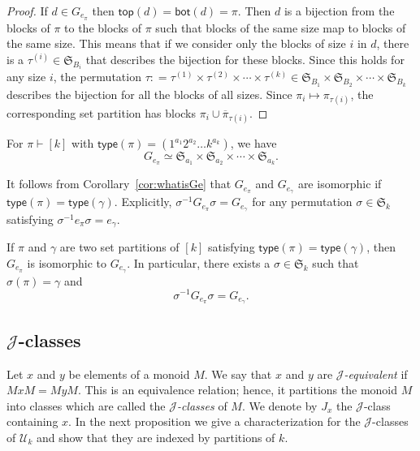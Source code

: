 \documentclass[ALCO,Unicode]{cedram}
\newcommand{\defncolor}{\color{darkred}}
\newcommand{\defn}[1]{{\defncolor\emph{#1}}} %
\begin{document}
\begin{proof}
If $d\in G_{e_\pi}$ then $\mathsf{top}(d) = \mathsf{bot}(d) = \pi$. Then $d$ is a bijection from the
blocks of $\pi$ to the blocks of $\pi$ such that blocks of the same size map to blocks of the same size.  This means that if
we consider only the blocks of size $i$ in $d$, there is a $\tau^{(i)} \in \mathfrak{S}_{B_i}$ that describes the bijection for these blocks.
Since this holds for any size $i$, the permutation $\tau : = \tau^{(1)} \times \tau^{(2)}\times \cdots \times \tau^{(k)} \in \mathfrak{S}_{B_1}
\times \mathfrak{S}_{B_2}\times \cdots \times \mathfrak{S}_{B_k}$ describes the bijection for all the blocks of all sizes.  Since $\pi_i \mapsto \pi_{\tau(i)}$,
the corresponding set partition has blocks $\pi_i \cup \overline{\pi}_{\tau(i)}$.
\end{proof}

\begin{cor} \label{cor:whatisGe}
For $\pi \vdash [k]$ with $\mathsf{type}(\pi)= (1^{a_1}2^{a_2}\ldots k^{a_k})$, we have
\[
    G_{e_\pi} \simeq \mathfrak{S}_{a_1} \times \mathfrak{S}_{a_2} \times \cdots \times \mathfrak{S}_{a_k}.
\]
\end{cor}

It follows from Corollary~\ref{cor:whatisGe} that
$G_{e_\pi}$ and $G_{e_\gamma}$ are isomorphic if $\mathsf{type}(\pi)
= \mathsf{type}(\gamma)$. Explicitly, $\sigma^{-1} G_{e_\pi} \sigma
= G_{e_\gamma}$ for any permutation $\sigma \in \mathfrak{S}_k$
satisfying $\sigma^{-1} e_\pi \sigma = e_\gamma$.

\begin{cor}\label{cor:isomGe}
If $\pi$ and $\gamma$ are two set partitions of $[k]$ satisfying $\mathsf{type}(\pi) = \mathsf{type}(\gamma)$, then $G_{e_\pi}$
is isomorphic to $G_{e_\gamma}$. In particular, there exists a $\sigma \in \mathfrak{S}_k$ such that $\sigma(\pi) = \gamma$ and
\[
    \sigma^{-1} G_{e_\pi} \sigma = G_{e_\gamma}.
\]
\end{cor}

\subsection{$\mathscr{J}$-classes}
\label{section.J classes}

Let $x$ and $y$ be elements of a monoid $M$.  We say that $x$ and $y$ are \defn{$\mathscr{J}$-equivalent} if $MxM = MyM$.
This is an equivalence relation; hence, it partitions the monoid $M$ into classes which are called the \defn{$\mathscr{J}$-classes} of $M$. We denote by \defn{$J_x$} the $\mathscr{J}$-class containing $x$.
In the next proposition we give a characterization for the $\mathscr{J}$-classes of $\mathcal{U}_k$ and show that they are indexed by partitions of $k$.
\end{document}
